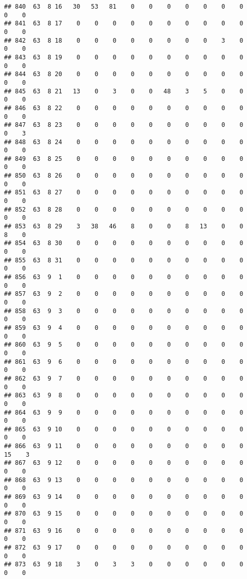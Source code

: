 \documentclass[]{article}
\begin{document}
\begin{verbatim}
## 840  63  8 16   30   53   81    0    0    0    0    0    0    0    0    0
## 841  63  8 17    0    0    0    0    0    0    0    0    0    0    0    0
## 842  63  8 18    0    0    0    0    0    0    0    0    3    0    0    0
## 843  63  8 19    0    0    0    0    0    0    0    0    0    0    0    0
## 844  63  8 20    0    0    0    0    0    0    0    0    0    0    0    0
## 845  63  8 21   13    0    3    0    0   48    3    5    0    0    0    0
## 846  63  8 22    0    0    0    0    0    0    0    0    0    0    0    0
## 847  63  8 23    0    0    0    0    0    0    0    0    0    0    0    3
## 848  63  8 24    0    0    0    0    0    0    0    0    0    0    0    0
## 849  63  8 25    0    0    0    0    0    0    0    0    0    0    0    0
## 850  63  8 26    0    0    0    0    0    0    0    0    0    0    0    0
## 851  63  8 27    0    0    0    0    0    0    0    0    0    0    0    0
## 852  63  8 28    0    0    0    0    0    0    0    0    0    0    0    0
## 853  63  8 29    3   38   46    8    0    0    8   13    0    0    8    0
## 854  63  8 30    0    0    0    0    0    0    0    0    0    0    0    0
## 855  63  8 31    0    0    0    0    0    0    0    0    0    0    0    0
## 856  63  9  1    0    0    0    0    0    0    0    0    0    0    0    0
## 857  63  9  2    0    0    0    0    0    0    0    0    0    0    0    0
## 858  63  9  3    0    0    0    0    0    0    0    0    0    0    0    0
## 859  63  9  4    0    0    0    0    0    0    0    0    0    0    0    0
## 860  63  9  5    0    0    0    0    0    0    0    0    0    0    0    0
## 861  63  9  6    0    0    0    0    0    0    0    0    0    0    0    0
## 862  63  9  7    0    0    0    0    0    0    0    0    0    0    0    0
## 863  63  9  8    0    0    0    0    0    0    0    0    0    0    0    0
## 864  63  9  9    0    0    0    0    0    0    0    0    0    0    0    0
## 865  63  9 10    0    0    0    0    0    0    0    0    0    0    0    0
## 866  63  9 11    0    0    0    0    0    0    0    0    0    0   15    3
## 867  63  9 12    0    0    0    0    0    0    0    0    0    0    0    0
## 868  63  9 13    0    0    0    0    0    0    0    0    0    0    0    0
## 869  63  9 14    0    0    0    0    0    0    0    0    0    0    0    0
## 870  63  9 15    0    0    0    0    0    0    0    0    0    0    0    0
## 871  63  9 16    0    0    0    0    0    0    0    0    0    0    0    0
## 872  63  9 17    0    0    0    0    0    0    0    0    0    0    0    0
## 873  63  9 18    3    0    3    3    0    0    0    0    0    0    0    0

\end{verbatim}
\end{document}
